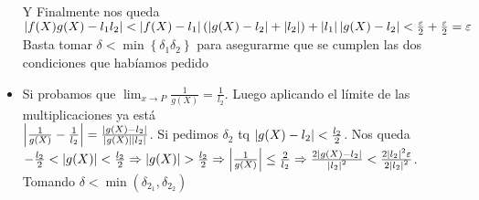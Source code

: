 \documentclass[a4paper,10pt]{article}
\begin{document}
\begin{demo}
\begin{itemize}
		Y Finalmente nos queda $\left\lvert f(X)g(X)-l_1l_2\right\rvert < \left\lvert f(X)-l_1\right\rvert(\left\lvert g(X)-l_2\right\rvert+\left\lvert l_2\right\rvert)+\left\lvert l_1\right\rvert\left\lvert g(X)-l_2\right\rvert < \frac{\varepsilon}{2} + \frac{\varepsilon}{2} = \varepsilon$ \\
		Basta tomar $\delta < \min\left\lbrace \delta_1 \delta_2 \right\rbrace$ para asegurarme que se cumplen las dos condiciones que habíamos pedido 
		\item Si probamos que $\lim_{x \to P} \frac{1}{g(X)} = \frac{1}{l_2}$. Luego aplicando el límite de las multiplicaciones ya está \\
		$\left\lvert\frac{1}{g(X)} - \frac{1}{l_2}\right\rvert = \frac{\left\lvert g(X)-l_2\right\rvert}{\left\lvert g(X)\right\rvert\left\lvert l_2\right\rvert}$. Si pedimos $\delta_2$ tq $\left\lvert g(X)-l_2\right\rvert<\frac{l_2}{2}$. Nos queda $-\frac{l_2}{2} < \left\lvert g(X)\right\rvert < \frac{l_2}{2} \Rightarrow \left\lvert g(X)\right\rvert > \frac{l_2}{2} \Rightarrow \left\lvert\frac{1}{g(X)}\right\rvert \leq \frac{2}{l_2} \Rightarrow \frac{2\left\lvert g(X)-l_2\right\rvert}{\left\lvert l_2\right\rvert^2} < \frac{2\left\lvert l_2\right\rvert^2\varepsilon}{2\left\lvert l_2\right\rvert^2}$. Tomando $\delta < \min(\delta_{2_1},\delta_{2_2})$
	\end{itemize}
\end{demo}
\fi
\hspace*{\fill} \\
\hspace*{\fill} \\
\end{document}
